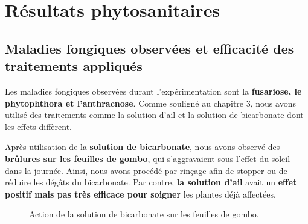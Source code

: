 \section{Résultats phytosanitaires}
\subsection{Maladies fongiques observées et efficacité des traitements appliqués}
Les maladies fongiques observées durant l'expérimentation sont la \textbf{fusariose, le phytophthora et l’anthracnose}. Comme souligné au chapitre 3, nous avons utilisé des traitements comme la solution d’ail et la solution de bicarbonate dont les effets diffèrent.

Après utilisation de la \textbf{solution de bicarbonate}, nous avons observé des \textbf{brûlures sur les feuilles de gombo}, qui s’aggravaient sous l’effet du soleil dans la journée. Ainsi, nous avons procédé par rinçage afin de stopper ou de réduire les dégâts du bicarbonate. Par contre, \textbf{la solution d’ail} avait un \textbf{effet positif mais pas très efficace pour soigner} les plantes déjà affectées.

\begin{figure}[H]
    \centering
    \caption{Action de la solution de bicarbonate sur les feuilles de gombo. }
    \label{fig:gombo-bruler}
\end{figure}

